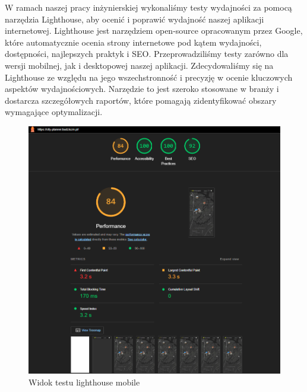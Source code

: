 W ramach naszej pracy inżynierskiej wykonaliśmy testy wydajności za pomocą narzędzia Lighthouse, aby ocenić i poprawić wydajność naszej aplikacji internetowej. \newline
Lighthouse jest narzędziem open-source opracowanym przez Google, które automatycznie ocenia strony internetowe pod kątem wydajności, dostępności, najlepszych praktyk i SEO. \newline
Przeprowadziliśmy testy zarówno dla wersji mobilnej, jak i desktopowej naszej aplikacji. \newline
Zdecydowaliśmy się na Lighthouse ze względu na jego wszechstronność i precyzję w ocenie kluczowych aspektów wydajnościowych.  \newline
Narzędzie to jest szeroko stosowane w branży i dostarcza szczegółowych raportów, które pomagają zidentyfikować obszary wymagające optymalizacji. \newline
\begin{figure}[H]
    \centering
    \includegraphics[width=1\textwidth]{attachments/lighthouse-mobile}
    \caption{Widok testu lighthouse mobile}
    \label{fig:testy-dostepnosci}
    \end{figure}

